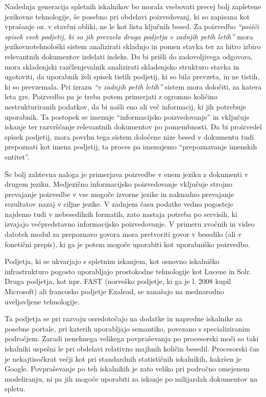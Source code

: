 \begin{multicols}{2}

Naslednja generacija spletnih iskalnikov bo morala vsebovati precej bolj zapletene jezikovne tehnologije, še posebno pri obdelavi poizvedovanj, ki so zapisana kot vprašanje oz. v stavčni obliki, ne le kot lista ključnih besed. Za poizvedbo \textit{“poišči spisek vseh podjetij, ki so jih prevzela druga podjetja v zadnjih petih letih”} mora jezikovnotehnološki sistem analizirati skladnjo in po\-men stavka ter za hitro izbiro relevantnih dokumentov izdelati indeks. Da bi prišli do zadovoljivega odgo\-vora, mora skladenj\-ski razčlenjevalnik analizirati skladenjsko strukturo stavka in ugotoviti, da uporabnik želi spisek tistih podjetij, ki so bila prevzeta, in ne tistih, ki so prevzemala. Pri izrazu \textit{“v zadnjih petih letih”} sistem mora določiti, za katera leta gre. Poizvedbo pa je treba potem primerjati z ogromno količino nestrukturiranih podatkov, da bi našli eno ali več informacij, ki jih potrebuje uporabnik. Ta postopek se imenuje “informacij\-sko poizvedovanje” in vključuje iskanje ter razvrščanje relevantnih dokumentov po pomembnosti. Da bi proizvedel spisek podjetij, mora povrhu tega sistem določene nize besed v dokumentu tudi prepoznati kot imena podjetij, ta proces pa imenujemo “prepoznavanje imenskih entitet”.\vspace*{0.13cm}

Še bolj zah\-tevna naloga je primerjava poizvedbe v enem jeziku z dokumenti v drugem jeziku. Medjezično informacij\-sko poizvedovanje vključuje stroj\-no prevajanje poizvedbe v vse mogoče izvorne jezike in naknadno prevajanje rezultatov nazaj v ciljne jezike. V zadnjem času podatke vedno pogosteje naj\-demo tudi v nebesedilnih formatih, zato nastaja potreba po servisih, ki izvajajo večpredstavno informacij\-sko poizvedovanje. V primeru zvočnih in video datotek modul za prepoznavo go\-vora mora pretvoriti go\-vor v besedilo (ali v fonetični prepis), ki ga je potem mogoče uporabiti kot uporabniško poizvedbo.\vspace*{0.13 cm}

Podjetja, ki se ukvarjajo s spletnim iskanjem, kot osnovno iskalniško infrastrukturo pogosto uporab\-ljajo prostokodne tehnologije kot Lucene in Solr. Druga podjetja, kot npr. FAST (norveško podjetje, ki ga je l. 2008 kupil Microsoft) ali francosko podjetje Exalead, se zanašajo na mednarodno uveljav\-ljene tehnologije. 

Ta podjetja se pri razvoju osredotočajo na dodatke in napredne iskalnike za posebne portale, pri katerih uporab\-ljajo semantiko, povezano s specializiranim področjem. Zaradi nenehnega velikega povpraševanja po procesorski moči so taki iskalniki uspešni le pri obdelavi relativno majhnih količin besedil. Procesorski čas je nekajtisočkrat večji kot pri standardnih statističnih iskalnikih, kakršen je Google. Povpraševanje po teh iskalnikih je zato veliko pri področno omejenem mo\-deliranju, ni pa jih mogoče uporabiti za iskanje po mili\-jardah dokumentov na spletu.


\end{multicols}
